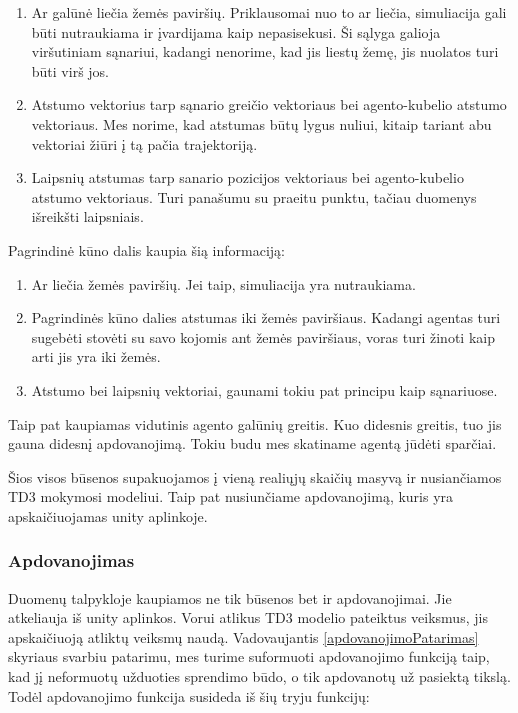 \documentclass[a4paper, 12pt]{article}
\begin{document}
\begin{enumerate}
  \addtolength{\itemsep}{-0.5\baselineskip} 
  \item Ar galūnė liečia žemės paviršių. Priklausomai nuo to ar liečia, simuliacija gali būti nutraukiama ir įvardijama kaip nepasisekusi. Ši sąlyga galioja viršutiniam sąnariui, kadangi nenorime, kad jis liestų žemę, jis nuolatos turi būti virš jos.
  \item Atstumo vektorius tarp sąnario greičio vektoriaus bei agento-kubelio atstumo vektoriaus. Mes norime, kad atstumas būtų lygus nuliui, kitaip tariant abu vektoriai žiūri į tą pačia trajektoriją.
  \item Laipsnių atstumas tarp sanario pozicijos vektoriaus bei agento-kubelio atstumo vektoriaus. Turi panašumu su praeitu punktu, tačiau duomenys išreikšti laipsniais.
\end{enumerate}

Pagrindinė kūno dalis kaupia šią informaciją:

\begin{enumerate}
  \addtolength{\itemsep}{-0.5\baselineskip} 
  \item Ar liečia žemės paviršių. Jei taip, simuliacija yra nutraukiama.
  \item Pagrindinės kūno dalies atstumas iki žemės paviršiaus. Kadangi agentas turi sugebėti stovėti su savo kojomis ant žemės paviršiaus, voras turi žinoti kaip arti jis yra iki žemės.
  \item Atstumo bei laipsnių vektoriai, gaunami tokiu pat principu kaip sąnariuose.
\end{enumerate}

Taip pat kaupiamas vidutinis agento galūnių greitis. Kuo didesnis greitis, tuo jis gauna didesnį apdovanojimą. Tokiu budu mes skatiname agentą jūdėti sparčiai.

Šios visos būsenos supakuojamos į vieną realiųjų skaičių masyvą ir nusiančiamos TD3 mokymosi modeliui. Taip pat nusiunčiame apdovanojimą, kuris yra apskaičiuojamas unity aplinkoje.

\subsubsection{Apdovanojimas}

Duomenų talpykloje kaupiamos ne tik būsenos bet ir apdovanojimai. Jie atkeliauja iš unity aplinkos. Vorui atlikus TD3 modelio pateiktus veiksmus, jis apskaičiuoją atliktų veiksmų naudą. Vadovaujantis \ref{apdovanojimoPatarimas} skyriaus svarbiu patarimu, mes turime suformuoti apdovanojimo funkciją taip, kad jį neformuotų užduoties sprendimo būdo, o tik apdovanotų už pasiektą tikslą. Todėl apdovanojimo funkcija susideda iš šių tryju funkcijų:
\end{document}
